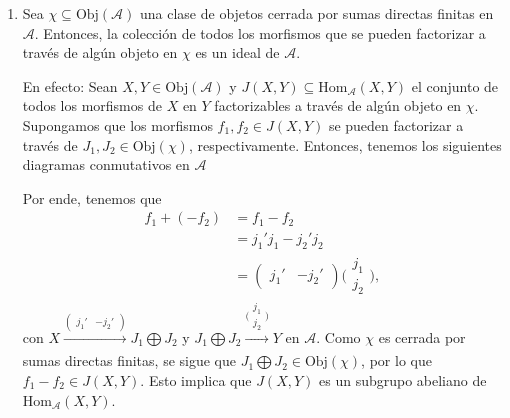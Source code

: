 \documentclass[tesis]{subfiles}
\begin{document}
\begin{Obs}
\begin{enumerate}[label=(\arabic*)]
            \item Sea $\chi\subseteq\text{Obj}(\mathscr{A})$ una clase de objetos cerrada por sumas directas finitas en $\mathscr{A}$. Entonces, la colección de todos los morfismos que se pueden factorizar a través de algún objeto en $\chi$ es un ideal de $\mathscr{A}$.

                En efecto: Sean $X,Y\in\text{Obj}(\mathscr{A})$ y $J(X,Y)\subseteq\text{Hom}_\mathscr{A}(X,Y)$ el conjunto de todos los morfismos de $X$ en $Y$ factorizables a través de algún objeto en $\chi$. Supongamos que los morfismos $f_1,f_2\in J(X,Y)$ se pueden factorizar a través de $J_1, J_2\in\text{Obj}(\chi)$, respectivamente. Entonces, tenemos los siguientes diagramas conmutativos en $\mathscr{A}$
                \begin{center}
                    \hspace{3cm}
                \end{center}
                Por ende, tenemos que
                \begin{align*}
                    f_1 + (-f_2) &= f_1 - f_2 \\
                                 &= j_1'j_1 - j_2'j_2 \\
                                 &= (\begin{smallmatrix} j_1' & -j_2' \end{smallmatrix}) \big(\begin{smallmatrix} j_1 \\ j_2 \end{smallmatrix}\big),
                \end{align*}
                con $X\xrightarrow[]{(\begin{smallmatrix} j_1' &-j_2' \end{smallmatrix})} J_1\bigoplus J_2$ y $J_1\bigoplus J_2\xrightarrow[]{\big(\begin{smallmatrix} j_1 \\ j_2 \end{smallmatrix}\big)}Y$ en $\mathscr{A}$. Como $\chi$ es cerrada por sumas directas finitas, se sigue que $J_1\bigoplus J_2\in\text{Obj}(\chi)$, por lo que $f_1-f_2\in J(X,Y)$. Esto implica que $J(X,Y)$ es un subgrupo abeliano de $\text{Hom}_\mathscr{A}(X,Y)$. 


\end{enumerate}
\end{Obs}
\end{document}
